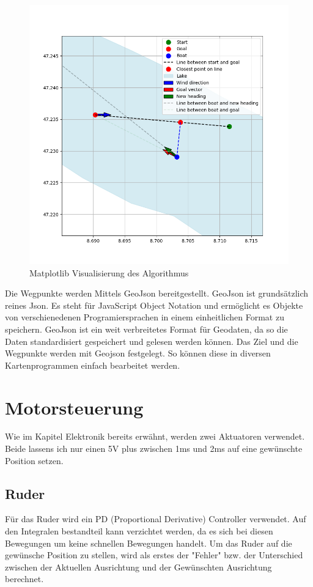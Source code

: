 \begin{figure}[H]
    \centering
    \includegraphics[width=1\linewidth]{assets/3.png}
    \caption{Matplotlib Visualisierung des Algorithmus}
    
\end{figure}

Die Wegpunkte werden Mittels GeoJson bereitgestellt. GeoJson ist grundsätzlich reines Json. Es steht für JavaScript Object Notation und ermöglicht es Objekte von verschienedenen Programiersprachen in einem einheitlichen Format zu speichern. GeoJson ist ein weit verbreitetes Format für Geodaten, da so die Daten standardisiert gespeichert und gelesen werden können.
Das Ziel und die Wegpunkte werden mit Geojson festgelegt. So können diese in diversen Kartenprogrammen einfach bearbeitet werden.

\section{Motorsteuerung}
Wie im Kapitel Elektronik bereits erwähnt, werden zwei Aktuatoren verwendet. Beide lassens ich nur einen 5V plus zwischen 1ms und 2ms auf eine gewünschte Position setzen. 

\subsection{Ruder}
Für das Ruder wird ein PD (Proportional Derivative) Controller verwendet. Auf den Integralen bestandteil kann verzichtet werden, da es sich bei diesen Bewegungen um keine schnellen Bewegungen handelt. 
Um das Ruder auf die gewünsche Position zu stellen, wird als erstes der "Fehler" bzw. der Unterschied zwischen der Aktuellen Ausrichtung und der Gewünschten Ausrichtung berechnet. 

